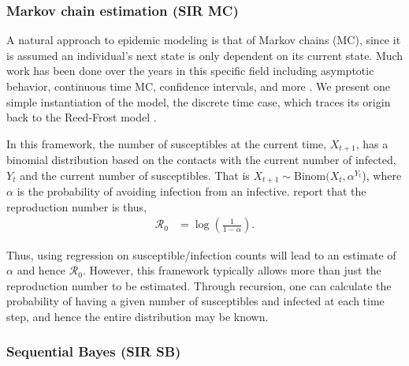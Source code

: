 \documentclass[12pt]{article}
\newcommand{\rr}{\ensuremath{\mathcal{R}_0}}
\begin{document}
\subsubsection{Markov chain estimation (SIR MC)}
A natural approach to epidemic modeling is that of Markov chains (MC), since it is assumed an individual's next state is only dependent on its current state.  Much work has been done over the years in this specific field including asymptotic behavior, continuous time MC, confidence intervals, and more \citep{jacquez1991,gani1995,daley2001epidemic}.  We present one simple instantiation of the model, the discrete time case, which traces its origin back to the Reed-Frost model \citep{abbey1952}.

In this framework, the number of susceptibles at the current time, $X_{t+1}$, has a binomial distribution based on the contacts with the current number of infected, $Y_t$ and the current number of susceptibles.  That is $X_{t+1} \sim \text{Binom}(X_t, \alpha^{Y_t}$), where $\alpha$ is the probability of avoiding infection from an infective.  \cite{barbour2004} report that the reproduction number is thus,
\begin{align}\label{eq:r0-mc}
\rr &= \log \left ( \frac{1}{1-\alpha}\right ).
\end{align}

Thus, using regression on susceptible/infection counts will lead to an estimate of $\alpha$ and hence $\rr$.  However, this framework typically allows more than just the reproduction number to be estimated.  Through recursion, one can calculate the probability of having a given number of susceptibles and infected at each time step, and hence the entire distribution may be known.





\subsubsection{Sequential Bayes (SIR SB)}\label{sec:seqbayes}
\end{document}

